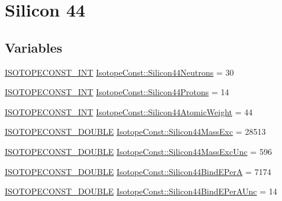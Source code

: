 \hypertarget{group___isotope_const-_silicon-_si44}{}\section{Silicon 44}
\label{group___isotope_const-_silicon-_si44}
\subsection*{Variables}
\begin{DoxyCompactItemize}
\item 
\mbox{\hyperlink{group___isotope_const-_macros_ga5f18360b3e99483a35c32d789e62621c}{I\+S\+O\+T\+O\+P\+E\+C\+O\+N\+S\+T\+\_\+\+I\+NT}} \mbox{\hyperlink{group___isotope_const-_silicon-_si44_gabe008198b76447aecf64934919436519}{Isotope\+Const\+::\+Silicon44\+Neutrons}} = 30
\item 
\mbox{\hyperlink{group___isotope_const-_macros_ga5f18360b3e99483a35c32d789e62621c}{I\+S\+O\+T\+O\+P\+E\+C\+O\+N\+S\+T\+\_\+\+I\+NT}} \mbox{\hyperlink{group___isotope_const-_silicon-_si44_ga4f6b97532e4cdbb7952a524ff23ab089}{Isotope\+Const\+::\+Silicon44\+Protons}} = 14
\item 
\mbox{\hyperlink{group___isotope_const-_macros_ga5f18360b3e99483a35c32d789e62621c}{I\+S\+O\+T\+O\+P\+E\+C\+O\+N\+S\+T\+\_\+\+I\+NT}} \mbox{\hyperlink{group___isotope_const-_silicon-_si44_ga76da45a3499d5d832b8c6608760bc37d}{Isotope\+Const\+::\+Silicon44\+Atomic\+Weight}} = 44
\item 
\mbox{\hyperlink{group___isotope_const-_macros_ga8f45a7272ce02c0b4c65c44636ed719a}{I\+S\+O\+T\+O\+P\+E\+C\+O\+N\+S\+T\+\_\+\+D\+O\+U\+B\+LE}} \mbox{\hyperlink{group___isotope_const-_silicon-_si44_gaf9f538e549997629aaeb79da7516fa40}{Isotope\+Const\+::\+Silicon44\+Mass\+Exc}} = 28513
\item 
\mbox{\hyperlink{group___isotope_const-_macros_ga8f45a7272ce02c0b4c65c44636ed719a}{I\+S\+O\+T\+O\+P\+E\+C\+O\+N\+S\+T\+\_\+\+D\+O\+U\+B\+LE}} \mbox{\hyperlink{group___isotope_const-_silicon-_si44_ga93516c33d6f58925e8180fd77edccf4e}{Isotope\+Const\+::\+Silicon44\+Mass\+Exc\+Unc}} = 596
\item 
\mbox{\hyperlink{group___isotope_const-_macros_ga8f45a7272ce02c0b4c65c44636ed719a}{I\+S\+O\+T\+O\+P\+E\+C\+O\+N\+S\+T\+\_\+\+D\+O\+U\+B\+LE}} \mbox{\hyperlink{group___isotope_const-_silicon-_si44_ga1bdbbeedc56ed9521a2d184486b45b15}{Isotope\+Const\+::\+Silicon44\+Bind\+E\+PerA}} = 7174
\item 
\mbox{\hyperlink{group___isotope_const-_macros_ga8f45a7272ce02c0b4c65c44636ed719a}{I\+S\+O\+T\+O\+P\+E\+C\+O\+N\+S\+T\+\_\+\+D\+O\+U\+B\+LE}} \mbox{\hyperlink{group___isotope_const-_silicon-_si44_ga64449c9fa6ed7017abe6c0e8a7c1214d}{Isotope\+Const\+::\+Silicon44\+Bind\+E\+Per\+A\+Unc}} = 14

\end{DoxyCompactItemize}
